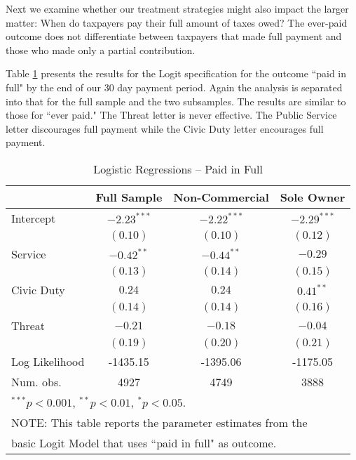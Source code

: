 \documentclass[12pt,titlepage]{article}
\begin{document}
Next we examine whether our treatment strategies might also impact the
larger matter: When do taxpayers pay their full amount of taxes owed?
The ever-paid outcome does not differentiate between taxpayers that
made full payment and those who made only a partial contribution.

Table \ref{VV} presents the results for the Logit specification for
the outcome ``paid in full" by the end of our 30 day payment period.
Again the analysis is separated into that for the full sample and the
two subsamples.  The results are similar to those for ``ever paid."
The Threat letter is never effective.  The Public Service letter
discourages full payment while the Civic Duty letter encourages full
payment.

\begin{table}[htbp]
\caption{Logistic Regressions -- Paid in Full}\label{VV}
\begin{center}
\begin{tabular}{| l c | c | c | }
\hline
               & Full Sample & Non-Commercial & Sole Owner \\
\hline
Intercept      & $-2.23^{***}$ & $-2.22^{***}$ & $-2.29^{***}$ \\
               & $(0.10)$      & $(0.10)$      & $(0.12)$      \\
Service          & $-0.42^{**}$  & $-0.44^{**}$  & $-0.29$       \\
               & $(0.13)$      & $(0.14)$      & $(0.15)$      \\
Civic Duty           & $0.24$        & $0.24$        & $0.41^{**}$   \\
               & $(0.14)$      & $(0.14)$      & $(0.16)$      \\
Threat         & $-0.21$       & $-0.18$       & $-0.04$       \\
               & $(0.19)$      & $(0.20)$      & $(0.21)$      \\
\hline
Log Likelihood & -1435.15      & -1395.06      & -1175.05      \\
Num. obs.      & 4927          & 4749          & 3888          \\
\hline
\multicolumn{4}{l}{$^{***}p<0.001$, $^{**}p<0.01$, $^*p<0.05$.} \\
\multicolumn{4}{l}{NOTE: This table reports the parameter estimates from the} \\
\multicolumn{4}{l}{basic Logit Model that uses ``paid in full" as outcome.}
\end{tabular}
\end{center}
\end{table}
\end{document}
